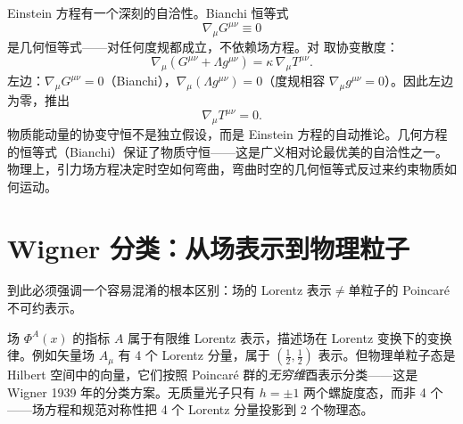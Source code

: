 Einstein 方程有一个深刻的自洽性。Bianchi 恒等式
\begin{equation}
\nabla_\mu G^{\mu\nu}\equiv 0
\end{equation}
是几何恒等式——对任何度规都成立，不依赖场方程。对 取协变散度：
\begin{equation*}
\nabla_\mu(G^{\mu\nu}+\Lambda g^{\mu\nu})=\kappa\,\nabla_\mu T^{\mu\nu}.
\end{equation*}
左边：$\nabla_\mu G^{\mu\nu}=0$（Bianchi），$\nabla_\mu(\Lambda g^{\mu\nu})=0$（度规相容 $\nabla_\mu g^{\mu\nu}=0$）。因此左边为零，推出
\begin{equation}
\nabla_\mu T^{\mu\nu}=0.
\end{equation}
物质能动量的协变守恒不是独立假设，而是 Einstein 方程的自动推论。几何方程的恒等式（Bianchi）保证了物质守恒——这是广义相对论最优美的自洽性之一。物理上，引力场方程决定时空如何弯曲，弯曲时空的几何恒等式反过来约束物质如何运动。

\section{Wigner 分类：从场表示到物理粒子}
到此必须强调一个容易混淆的根本区别：场的 Lorentz 表示$\neq$单粒子的 Poincaré 不可约表示。

场 $\Phi^A(x)$ 的指标 $A$ 属于有限维 Lorentz 表示，描述场在 Lorentz 变换下的变换律。例如矢量场 $A_\mu$ 有 4 个 Lorentz 分量，属于 $(\frac{1}{2},\frac{1}{2})$ 表示。但物理单粒子态是 Hilbert 空间中的向量，它们按照 Poincaré 群的\emph{无穷维}酉表示分类——这是 Wigner 1939 年的分类方案。无质量光子只有 $h=\pm1$ 两个螺旋度态，而非 4 个——场方程和规范对称性把 4 个 Lorentz 分量投影到 2 个物理态。

